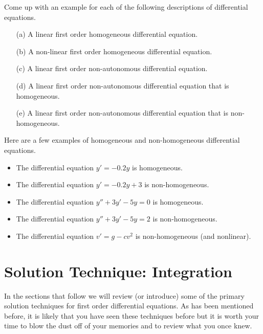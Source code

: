 \begin{problem}
    Come up with an example for each of the following descriptions of differential
    equations.
    \begin{enumerate}
        \item[(a)] A linear first order homogeneous differential equation.
        \item[(b)] A non-linear first order homogeneous differential equation.
        \item[(c)] A linear first order non-autonomous differential equation.
        \item[(d)] A linear first order non-autonomous differential equation that is
            homogeneous.
        \item[(e)] A linear first order non-autonomous differential equation that is
            non-homogeneous.
    \end{enumerate}
\end{problem}
\begin{example}
    Here are a few examples of homogeneous and non-homogeneous differential equations.
    \begin{itemize}
        \item The differential equation $y' = -0.2y$ is homogeneous.
        \item The differential equation $y' = -0.2y + 3$ is non-homogeneous.
        \item The differential equation $y'' + 3y' - 5y = 0$ is homogeneous.
        \item The differential equation $y'' + 3y' - 5y = 2$ is non-homogeneous.
        \item The differential equation $v' = g - c v^2$ is non-homogeneous (and
            nonlinear).
    \end{itemize}
\end{example}


\section{Solution Technique: Integration}
In the sections that follow we will review (or introduce) some of the primary solution
techniques for first order differential equations.  As has been mentioned before, it is
likely that you have seen these techniques before but it is worth your time to blow the
dust off of your memories and to review what you once knew.  

